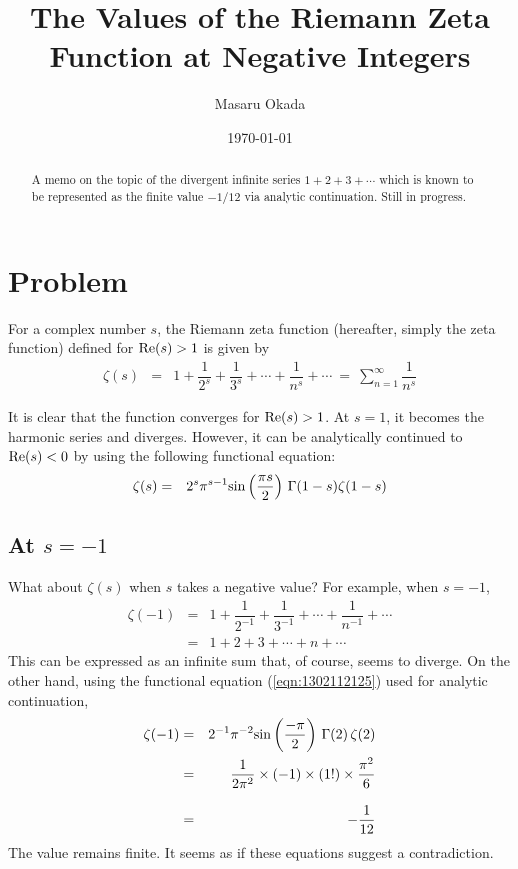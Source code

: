 \documentclass[uplatex,a4j,12pt,dvipdfmx]{jsarticle}
\title{The Values of the Riemann Zeta Function at Negative Integers}
\author{Masaru Okada}
\date{\today}
\begin{document}
\allowdisplaybreaks
\maketitle

\begin{abstract}
	A memo on the topic of the divergent infinite series $1+2+3+\cdots$ which is known to be represented as the finite value $-1/12$ via analytic continuation. Still in progress.
\end{abstract}

\section{Problem}

For a complex number $s$, the Riemann zeta function (hereafter, simply the zeta function) defined for ${\rm Re}(s) > 1$ is given by
\begin{eqnarray}
	\zeta(s)
	&=&
	1
	+
	\dfrac{1}{2^{s}}
	+
	\dfrac{1}{3^{s}}
	+
	\cdots
	+
	\dfrac{1}{n^{s}}
	+
	\cdots
	\ = \
	\sum_{n=1}^{\infty}
	\dfrac{1}{n^{s}}
\end{eqnarray}

It is clear that the function converges for ${\rm Re}(s) > 1$.
At $s=1$, it becomes the harmonic series and diverges.
However, it can be analytically continued to ${\rm Re}(s) < 0$ by using the following functional equation:
\begin{eqnarray}
	\zeta(s)
	&=&
	2^{s}
	\pi^{s-1}
	{\rm sin}
	\left(
	\dfrac{\pi s}{2}
	\right)
	\ \!
	\Gamma(1-s)
	\zeta(1-s)
	\label{eqn:1302112125}
\end{eqnarray}

\subsection{At $s=-1$}

What about $\zeta(s)$ when $s$ takes a negative value? For example, when $s=-1$,
\begin{eqnarray}
	\zeta(-1)
	&=&
	1
	+
	\dfrac{1}{2^{-1}}
	+
	\dfrac{1}{3^{-1}}
	+
	\cdots
	+
	\dfrac{1}{n^{-1}}
	+
	\cdots
	\nonumber \\[3mm] &=&
	1+2+3+\cdots+n+\cdots
\end{eqnarray}
This can be expressed as an infinite sum that, of course, seems to diverge.
On the other hand, using the functional equation (\ref{eqn:1302112125}) used for analytic continuation,
\begin{eqnarray}
	\zeta(-1)
	&=&
	2^{-1}
	\pi^{-2}
	{\rm sin}
	\left(
	\frac{- \pi}{2}
	\right)
	\ \!
	\Gamma(2)
	\ \!
	\zeta(2)
	\nonumber \\ &=&
	\frac{1}{2 \pi^{2}}
	\times
	(-1)
	\times
	(1!)
	\times
	\frac{\pi^{2}}{6}
	\nonumber \\[3mm] &=&
	- \frac{1}{12}
\end{eqnarray}
The value remains finite. It seems as if these equations suggest a contradiction.
\end{document}
